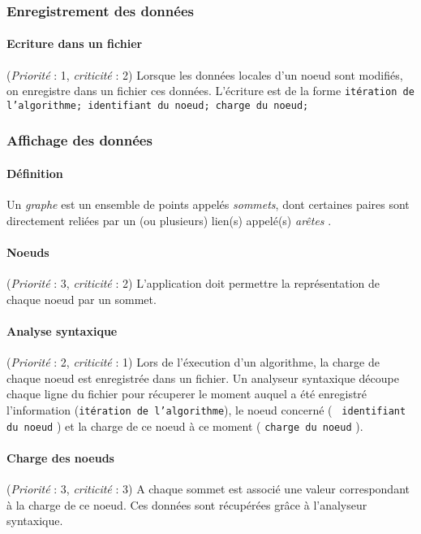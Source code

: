 \documentclass[12pt]{article}
\newcommand{\besoin}[2] {
  (\textit{Priorité} : #1, \textit{criticité} : #2)
}
\begin{document}
\subsubsection{Enregistrement des données}

\paragraph{Ecriture dans un fichier} \besoin{1}{2} Lorsque les données locales d'un noeud sont modifiés, on enregistre dans un fichier ces données.
L'écriture est de la forme \texttt{itération de l'algorithme; identifiant du noeud; charge du noeud;}

\subsubsection{Affichage des données}

\paragraph{Définition} Un \textit{graphe} est un ensemble de points appelés \textit{sommets}, dont certaines paires sont directement reliées par un (ou plusieurs) lien(s) appelé(s) \textit{arêtes} \cite{graphe}. 

\paragraph{Noeuds} \besoin{3}{2} L'application doit permettre la représentation de chaque noeud par un sommet.

\paragraph{Analyse syntaxique} \besoin{2}{1} Lors de l'éxecution d'un algorithme, la charge de chaque noeud est enregistrée dans un fichier.
Un analyseur syntaxique découpe chaque ligne du fichier pour récuperer le moment auquel a été enregistré l'information (\texttt{itération de l'algorithme}),
le noeud concerné ( \texttt{ identifiant du noeud} ) et la charge de ce noeud à ce moment ( \texttt{charge du noeud} ).

\paragraph{Charge des noeuds}  \besoin{3}{3} A chaque sommet est associé une valeur correspondant à la charge de ce noeud.
Ces données sont récupérées grâce à l'analyseur syntaxique.
\end{document}
